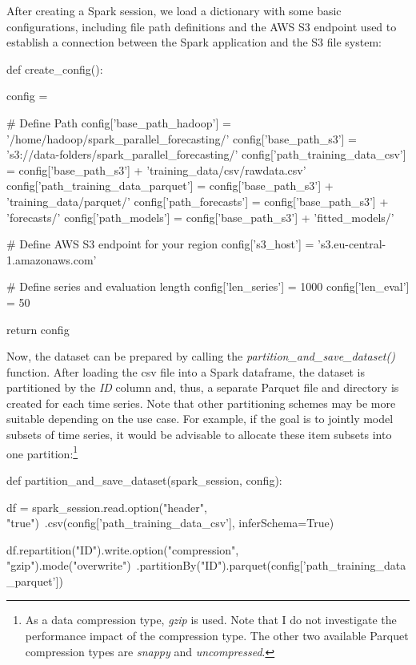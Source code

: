 \documentclass[11pt]{article}
\begin{document}
After creating a Spark session, we load a dictionary with some basic configurations, including file path definitions and the AWS S3 endpoint used to establish a connection between the Spark application and the S3 file system:

\begin{python}[caption={\emph{create\_config.py}}]
def create_config():

    config = {}

    # Define Path
    config['base_path_hadoop'] = '/home/hadoop/spark_parallel_forecasting/'
    config['base_path_s3'] = 's3://data-folders/spark_parallel_forecasting/'
    config['path_training_data_csv'] = config['base_path_s3'] + 'training_data/csv/rawdata.csv'
    config['path_training_data_parquet'] = config['base_path_s3'] + 'training_data/parquet/'
    config['path_forecasts'] = config['base_path_s3'] + 'forecasts/'
    config['path_models'] = config['base_path_s3'] + 'fitted_models/'

    # Define AWS S3 endpoint for your region
    config['s3_host'] = 's3.eu-central-1.amazonaws.com'

    # Define series and evaluation length
    config['len_series'] = 1000
    config['len_eval'] = 50

    return config
\end{python}

Now, the dataset can be prepared by calling the \emph{partition\_and\_save\_dataset()} function. After loading the csv file into a Spark dataframe, the dataset is partitioned by the \emph{ID} column and, thus, a separate Parquet file and directory is created for each time series. Note that other partitioning schemes may be more suitable depending on the use case. For example, if the goal is to jointly model subsets of time series, it would be advisable to allocate these item subsets into one partition:\footnote{As a data compression type, \emph{gzip} is used. Note that I do not investigate the performance impact of the compression type. The other two available Parquet compression types are \emph{snappy} and \emph{uncompressed}.}    

\begin{python}[caption={\emph{partition\_and\_save\_dataset.py}}]
def partition_and_save_dataset(spark_session, config):

    df = spark_session.read.option("header", "true")\
        .csv(config['path_training_data_csv'], inferSchema=True)

    df.repartition("ID").write.option("compression", "gzip").mode("overwrite")\
        .partitionBy("ID").parquet(config['path_training_data_parquet'])
\end{python}  
\end{document}
